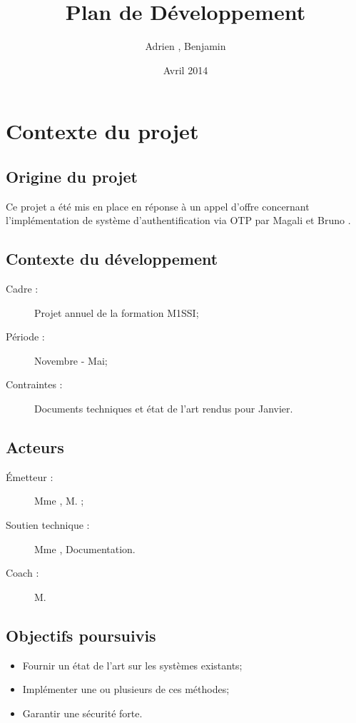 \documentclass{../../res/univ-projet}
\title{Plan de Développement}
\author{Adrien \bsc{Smondack}, Benjamin \bsc{Zigh}}
\date{Avril 2014}
\begin{document}
\maketitle

\section{Contexte du projet}
\subsection{Origine du projet}
	Ce projet a été mis en place en réponse à un appel d'offre concernant l'implémentation de système d'authentification via OTP par Magali  et Bruno .
	
\subsection{Contexte du développement}
	\begin{description} 
		\item [Cadre :] Projet annuel de la formation M1SSI;
		\item [Période :] Novembre - Mai;
		\item [Contraintes :] Documents techniques et état de l'art rendus pour Janvier.
	\end{description}

\subsection{Acteurs}
	\begin{description}
		\item [Émetteur :] Mme , M. ;
		\item [Soutien technique :] Mme , Documentation.
		\item [Coach :] M. 
	\end{description}

\subsection{Objectifs poursuivis}
	\begin{itemize}
		\item Fournir un état de l'art sur les systèmes existants;
		\item Implémenter une ou plusieurs de ces méthodes;
		\item Garantir une sécurité forte.
	\end{itemize}
\end{document}
